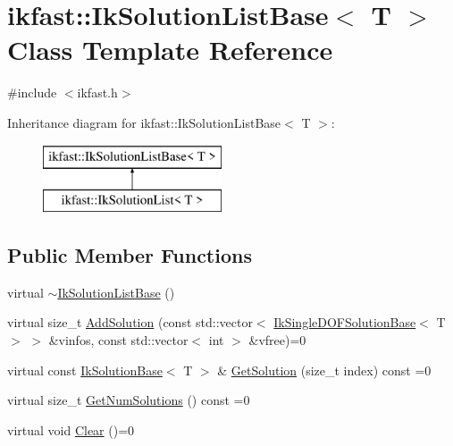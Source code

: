 \hypertarget{classikfast_1_1IkSolutionListBase}{\section{ikfast\-:\-:Ik\-Solution\-List\-Base$<$ T $>$ Class Template Reference}
\label{classikfast_1_1IkSolutionListBase}
}


{\ttfamily \#include $<$ikfast.\-h$>$}

Inheritance diagram for ikfast\-:\-:Ik\-Solution\-List\-Base$<$ T $>$\-:\begin{figure}[H]
\begin{center}
\leavevmode
\includegraphics[height=2.000000cm]{classikfast_1_1IkSolutionListBase}
\end{center}
\end{figure}
\subsection*{Public Member Functions}
\begin{DoxyCompactItemize}
\item 
virtual \hyperlink{classikfast_1_1IkSolutionListBase_a1200afc2fc92110d9f8191039f0f7d6c}{$\sim$\-Ik\-Solution\-List\-Base} ()
\item 
virtual size\-\_\-t \hyperlink{classikfast_1_1IkSolutionListBase_a9d862f550472c2fa15189946b12222bf}{Add\-Solution} (const std\-::vector$<$ \hyperlink{classikfast_1_1IkSingleDOFSolutionBase}{Ik\-Single\-D\-O\-F\-Solution\-Base}$<$ T $>$ $>$ \&vinfos, const std\-::vector$<$ int $>$ \&vfree)=0
\item 
virtual const \hyperlink{classikfast_1_1IkSolutionBase}{Ik\-Solution\-Base}$<$ T $>$ \& \hyperlink{classikfast_1_1IkSolutionListBase_a540d8c85b5be635ea671ef7ddc0eb9c0}{Get\-Solution} (size\-\_\-t index) const =0
\item 
virtual size\-\_\-t \hyperlink{classikfast_1_1IkSolutionListBase_a5f4a2191825f1d2aad3468daf94d575f}{Get\-Num\-Solutions} () const =0
\item 
virtual void \hyperlink{classikfast_1_1IkSolutionListBase_a9940fe21cfa0a67c1a21a672696c5cb5}{Clear} ()=0
\end{DoxyCompactItemize}


